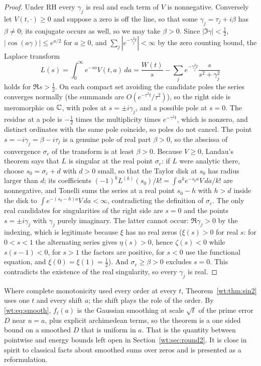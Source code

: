 \begin{proof}
Under RH every $\gamma_j$ is real and each term of $V$ is nonnegative. Conversely let $V(t,\cdot)\ge0$ and suppose a zero is off the line, so that some $\gamma_j=\tau_j+i\beta$ has $\beta\ne0$; its conjugate occurs as well, so we may take $\beta>0$. Since $|\Im\gamma|<\frac12$, $|\cos(a\gamma)|\le e^{a/2}$ for $a\ge0$, and $\sum_j|e^{-\gamma_j^2t}|<\infty$ by the zero counting bound, the Laplace transform
\[
L(s)=\int_0^\infty e^{-sa}V(t,a)\,da=\frac{W(t)}s-\sum_je^{-\gamma_j^2t}\frac s{s^2+\gamma_j^2}
\]
holds for $\Re s>\frac12$. On each compact set avoiding the candidate poles the series converges normally (the summands are $O(e^{-\tau^2t}/\tau^2)$), so the right side is meromorphic on $\mathbb{C}$, with poles at $s=\pm i\gamma_j$, and a possible pole at $s=0$. The residue at a pole is $-\frac12$ times the multiplicity times $e^{-\gamma^2t}$, which is nonzero, and distinct ordinates with the same pole coincide, so poles do not cancel. The point $s=-i\gamma_j=\beta-i\tau_j$ is a genuine pole of real part $\beta>0$, so the abscissa of convergence $\sigma_c$ of the transform is at least $\beta>0$. Because $V\ge0$, Landau's theorem says that $L$ is singular at the real point $\sigma_c$: if $L$ were analytic there, choose $s_0=\sigma_c+d$ with $d>0$ small, so that the Taylor disk at $s_0$ has radius larger than $d$; its coefficients $(-1)^kL^{(k)}(s_0)/k!=\int a^ke^{-s_0a}V\,da/k!$ are nonnegative, and Tonelli sums the series at a real point $s_0-h$ with $h>d$ inside the disk to $\int e^{-(s_0-h)a}V\,da<\infty$, contradicting the definition of $\sigma_c$. The only real candidates for singularities of the right side are $s=0$ and the points $s=\pm i\gamma_j$ with $\gamma_j$ purely imaginary. The latter cannot occur: $\Re\gamma_j>0$ by the indexing, which is legitimate because $\xi$ has no real zeros ($\xi(s)>0$ for real $s$: for $0<s<1$ the alternating series gives $\eta(s)>0$, hence $\zeta(s)<0$ while $s(s-1)<0$, for $s>1$ the factors are positive, for $s<0$ use the functional equation, and $\xi(0)=\xi(1)=\frac12$). And $\sigma_c\ge\beta>0$ excludes $s=0$. This contradicts the existence of the real singularity, so every $\gamma_j$ is real.
\end{proof}

Where complete monotonicity used every order at every $t$, Theorem~\ref{wt:thm:sin2} uses one $t$ and every shift $a$; the shift plays the role of the order. By \eqref{wt:eq:smooth}, $f_t(a)$ is the Gaussian smoothing at scale $\sqrt t$ of the prime error $D$ near $u=a$, plus explicit archimedean terms, so the theorem is a one sided bound on a smoothed $D$ that is uniform in $a$. That is the quantity between pointwise and energy bounds left open in Section~\ref{wt:sec:round2}. It is close in spirit to classical facts about smoothed sums over zeros and is presented as a reformulation.

